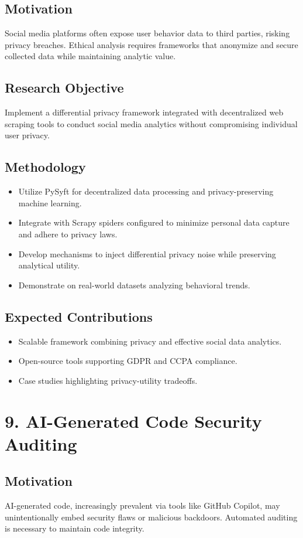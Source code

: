 \documentclass[11pt]{article}
\begin{document}
\subsection{Motivation}
\label{sec:orgcb3725c}
Social media platforms often expose user behavior data to third parties, risking privacy breaches. Ethical analysis requires frameworks that anonymize and secure collected data while maintaining analytic value.
\subsection{Research Objective}
\label{sec:orgad4efdc}
Implement a differential privacy framework integrated with decentralized web scraping tools to conduct social media analytics without compromising individual user privacy.
\subsection{Methodology}
\label{sec:orge7b7a16}
\begin{itemize}
\item Utilize PySyft for decentralized data processing and privacy-preserving machine learning.
\item Integrate with Scrapy spiders configured to minimize personal data capture and adhere to privacy laws.
\item Develop mechanisms to inject differential privacy noise while preserving analytical utility.
\item Demonstrate on real-world datasets analyzing behavioral trends.
\end{itemize}
\subsection{Expected Contributions}
\label{sec:org23cd8ea}
\begin{itemize}
\item Scalable framework combining privacy and effective social data analytics.
\item Open-source tools supporting GDPR and CCPA compliance.
\item Case studies highlighting privacy-utility tradeoffs.
\end{itemize}
\section{9. AI-Generated Code Security Auditing}
\label{sec:orgc965bcc}
\subsection{Motivation}
\label{sec:org2eb0a15}
AI-generated code, increasingly prevalent via tools like GitHub Copilot, may unintentionally embed security flaws or malicious backdoors. Automated auditing is necessary to maintain code integrity.
\end{document}
